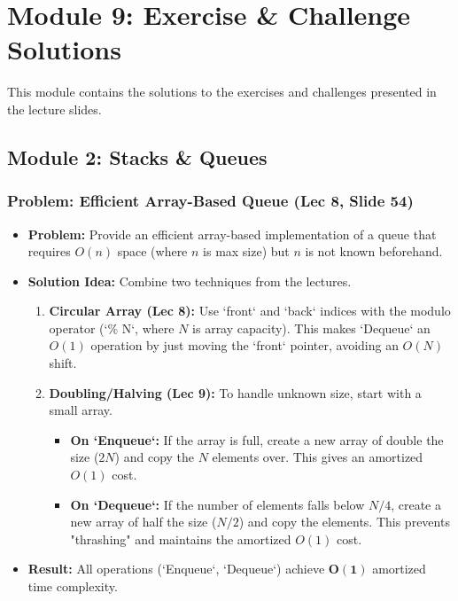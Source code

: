 
\section{Module 9: Exercise \& Challenge Solutions}
This module contains the solutions to the exercises and challenges presented in the lecture slides.

\subsection{Module 2: Stacks \& Queues}

\subsubsection{Problem: Efficient Array-Based Queue (Lec 8, Slide 54)}
\begin{itemize}
    \item \textbf{Problem:} Provide an efficient array-based implementation of a queue that requires $O(n)$ space (where $n$ is max size) but $n$ is not known beforehand.
    \item \textbf{Solution Idea:} Combine two techniques from the lectures.
    \begin{enumerate}
        \item \textbf{Circular Array (Lec 8):} Use `front` and `back` indices with the modulo operator (`\% N`, where $N$ is array capacity). This makes `Dequeue` an $O(1)$ operation by just moving the `front` pointer, avoiding an $O(N)$ shift.
        \item \textbf{Doubling/Halving (Lec 9):} To handle unknown size, start with a small array.
        \begin{itemize}
            \item \textbf{On `Enqueue`:} If the array is full, create a new array of double the size ($2N$) and copy the $N$ elements over. This gives an amortized $O(1)$ cost.
            \item \textbf{On `Dequeue`:} If the number of elements falls below $N/4$, create a new array of half the size ($N/2$) and copy the elements. This prevents "thrashing" and maintains the amortized $O(1)$ cost.
        \end{itemize}
    \end{enumerate}
    \item \textbf{Result:} All operations (`Enqueue`, `Dequeue`) achieve $\mathbf{O(1)}$ amortized time complexity.
\end{itemize}

